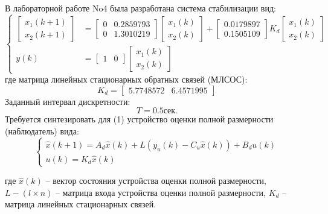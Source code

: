 \documentclass[a4paper,14pt]{extreport}
\begin{document}
	В лабораторной работе No4 была разработана система стабилизации вид:
	\begin{equation}
	\begin{cases}
	\begin{bmatrix}
	x_1(k+1)\\
	x_2(k+1)
	\end{bmatrix} &=
	\begin{bmatrix}
	0&0.2859793\\
	0& 1.3010219
	\end{bmatrix}
	\begin{bmatrix}
	x_1(k)\\
	x_2(k)
	\end{bmatrix} + 
	\begin{bmatrix}
	0.0179897\\
	0.1505109
	\end{bmatrix}
	K_d 	
	\begin{bmatrix}
	x_1(k)\\
	x_2(k)
	\end{bmatrix}\\
	y(k) &= 
	\begin{bmatrix}
	1 & 0
	\end{bmatrix}
	\begin{bmatrix}
	x_1(k)\\
	x_2(k)
	\end{bmatrix}
	\end{cases}
	\end{equation}
	где матрица линейных стационарных обратных связей (МЛСОС):
	\begin{equation}
	K_d = 
	\begin{bmatrix}
	5.7748572    &6.4571995 
	\end{bmatrix}
	\end{equation}
	Заданный интервал дискретности:
	\begin{equation}
		T = 0.5 сек.
	\end{equation}
	Требуется синтезировать для (1) устройство оценки полной размерности (наблюдатель) вида:
	\begin{equation}
		\begin{cases}
		\hat{x} (k+1) = A_d \hat{x}(k) +L (y_u (k) - C_u \hat{x} (k)) + B_d u(k)\\
		u(k) = K_d \hat{x} (k)
		\end{cases}
	\end{equation}
	
	где $\hat{x} (k)$ -- вектор состояния устройства оценки полной размерности, 	$L - (l \times n)$ -- матрица входа устройства оценки полной размерности, $K_d$ -- матрица линейных стационарных связей.
	
\end{document}

